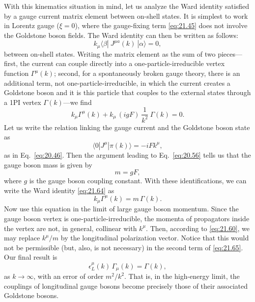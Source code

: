 With this kinematics situation in mind, let us analyze the Ward identity
satisfied by a gauge current matrix element between on-shell states.  It is
simplest to work in Lorentz gauge ($\xi = 0$), where the gauge-fixing term
\eqref{eq:21.45} does not involve the Goldstone boson fields.  The Ward
identity can then be written as follows:
\begin{equation}
  k_\mu\langle \beta|\ J^{\mu a}(k)\ |\alpha\rangle = 0 ,
  \label{eq:21.64}
\end{equation}
between on-shell states.  Writing the matrix element as the sum of two
pieces---first, the current can couple directly into a one-particle-irreducible
vertex function $\Gamma^\mu(k)$; second, for a spontaneously broken gauge
theory, there is an additional term, not one-particle-irreducible, in which
the current creates a Goldstone boson and it is this particle that couples to
the external states through a 1PI vertex $\Gamma(k)$---we find
\begin{equation}
  k_\mu\Gamma^\mu(k) + k_\mu\,(igF)\ \frac{1}{k^2}\ \Gamma(k) = 0 .
  \label{eq:21.65}
\end{equation}
Let us write the relation linking the gauge current and the Goldstone boson
state as
\begin{equation}
  \langle 0|J^\mu|\pi(k)\rangle = -iF k^\mu ,
  \label{eq:21.62}
\end{equation}
as in Eq.~\eqref{eq:20.46}.  Then the argument leading to Eq.~\eqref{eq:20.56}
tells us that the gauge boson mass is given by
\begin{equation}
  m = gF ,
  \label{eq:21.63}
\end{equation}
where $g$ is the gauge boson coupling constant.  With these identifications,
we can write the Ward identity \eqref{eq:21.64} as
\begin{equation}
  k_\mu\Gamma^\mu(k) = m\,\Gamma(k) .
  \label{eq:21.66}
\end{equation}
Now use this equation in the limit of large gauge boson momentum.  Since the
gauge boson vertex is one-particle-irreducible, the momenta of propagators
inside the vertex are not, in general, collinear with $k^\mu$.  Then,
according to \eqref{eq:21.60}, we may replace $k^\mu/m$ by the longitudinal
polarization vector.  Notice that this would not be permissible (but, also,
is not necessary) in the second term of \eqref{eq:21.65}.  Our final result
is
\begin{equation}
  \epsilon^\mu_L(k)\,\Gamma_\mu(k) = \Gamma(k) ,
  \label{eq:21.67}
\end{equation}
as $k\to\infty$, with an error of order $m^2/k^2$.  That is, in the
high-energy limit, the couplings of longitudinal gauge bosons become
precisely those of their associated Goldstone bosons.

